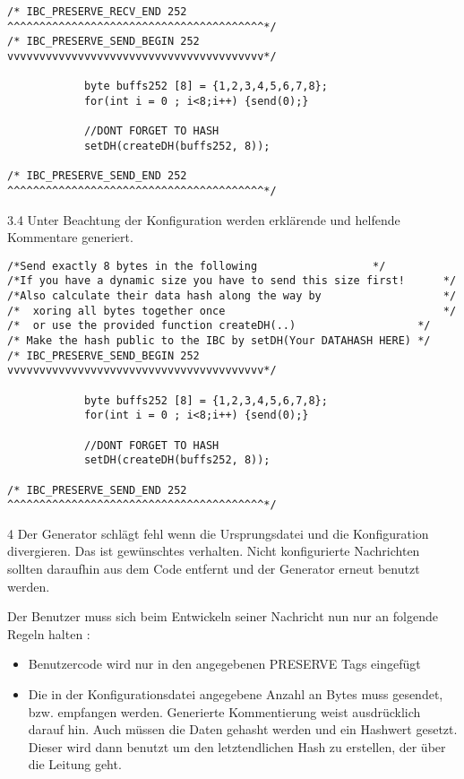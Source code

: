 \begin{itemize}
\begin{center}
\begin{center}
\begin{verbatim}
/* IBC_PRESERVE_RECV_END 252 ^^^^^^^^^^^^^^^^^^^^^^^^^^^^^^^^^^^^^^^^*/
/* IBC_PRESERVE_SEND_BEGIN 252 vvvvvvvvvvvvvvvvvvvvvvvvvvvvvvvvvvvvvvvv*/
			
			byte buffs252 [8] = {1,2,3,4,5,6,7,8};
			for(int i = 0 ; i<8;i++) {send(0);}
			
			//DONT FORGET TO HASH
			setDH(createDH(buffs252, 8));
			
/* IBC_PRESERVE_SEND_END 252 ^^^^^^^^^^^^^^^^^^^^^^^^^^^^^^^^^^^^^^^^*/
		\end{verbatim}


	\item 3.4 Unter Beachtung der Konfiguration werden erklärende und helfende Kommentare generiert.

		\begin{verbatim}
/*Send exactly 8 bytes in the following                  */
/*If you have a dynamic size you have to send this size first!      */
/*Also calculate their data hash along the way by                   */
/*  xoring all bytes together once                                  */
/*  or use the provided function createDH(..)                   */
/* Make the hash public to the IBC by setDH(Your DATAHASH HERE) */
/* IBC_PRESERVE_SEND_BEGIN 252 vvvvvvvvvvvvvvvvvvvvvvvvvvvvvvvvvvvvvvvv*/
			
            byte buffs252 [8] = {1,2,3,4,5,6,7,8};
			for(int i = 0 ; i<8;i++) {send(0);}
			
			//DONT FORGET TO HASH
			setDH(createDH(buffs252, 8));
			
/* IBC_PRESERVE_SEND_END 252 ^^^^^^^^^^^^^^^^^^^^^^^^^^^^^^^^^^^^^^^^*/

		\end{verbatim}

	\item 4 Der Generator schlägt fehl wenn die Ursprungsdatei und die Konfiguration divergieren. Das ist gewünschtes verhalten. Nicht konfigurierte Nachrichten sollten daraufhin aus dem Code entfernt und der Generator erneut benutzt werden.

Der Benutzer muss sich beim Entwickeln seiner Nachricht nun nur an folgende Regeln halten :
\begin{itemize}
	\item Benutzercode wird nur in den angegebenen PRESERVE Tags eingefügt
	\item Die in der Konfigurationsdatei angegebene Anzahl an Bytes muss gesendet, bzw. empfangen werden. Generierte Kommentierung weist ausdrücklich darauf hin. Auch müssen die Daten gehasht werden und ein Hashwert gesetzt. Dieser wird dann benutzt um den letztendlichen Hash zu erstellen, der über die Leitung geht.
\end{itemize}


\end{center}
\end{center}
\end{itemize}
